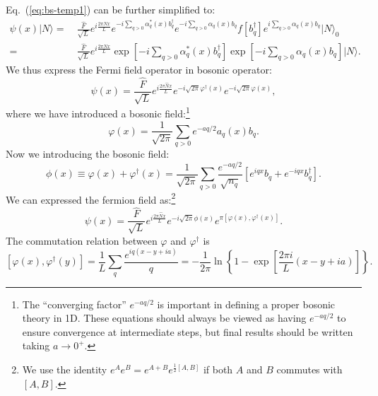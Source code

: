 Eq.~(\ref{eq:bs-temp1}) can be further simplified to:
\begin{equation*}
\begin{aligned}
	\psi(x)|N\rangle 
	=&\ \frac{\hat{F}}{\sqrt{L}} e^{i \frac{2 \pi \hat{N} x}{L}} e^{-i\sum_{q>0} \alpha^*_{q}(x) b_{q}^{\dagger}} e^{-i\sum_{q>0} \alpha_{q}(x) b_{q}} f\left[b_{q}^{\dagger}\right] e^{i\sum_{q>0} \alpha_{q}(x) b_{q}} |N\rangle_{0} \\
	=&\ \frac{\hat{F}}{\sqrt{L}} e^{i \frac{2 \pi \hat{N} x}{L}} \exp \left[-i\sum_{q>0} \alpha^*_{q}(x) b_{q}^{\dagger}\right] \exp \left[-i\sum_{q>0} \alpha_{q}(x) b_{q}\right]|N\rangle.
\end{aligned}
\end{equation*}
We thus express the Fermi field operator in bosonic operator:
\begin{equation}\label{eq:bs-fermi-field-1}
	\psi(x) = \frac{\hat{F}}{\sqrt{L}} e^{i \frac{2 \pi \hat{N} x}{L}} e^{-i\sqrt{2\pi}\varphi^\dagger(x)} e^{-i\sqrt{2\pi}\varphi(x)},
\end{equation}
where we have introduced a bosonic field:\footnote{The ``converging factor'' $e^{-a q / 2}$ is important in defining a proper bosonic theory in 1D. These equations should always be viewed as having $e^{-a q / 2}$ to ensure convergence at intermediate steps, but final results should be written taking $a \rightarrow 0^{+}$.}
\begin{equation}
	\varphi(x) = \frac{1}{\sqrt{2\pi}}\sum_{q>0} e^{-a q/2} a_{q}(x) b_{q}.
\end{equation}
Now we introducing the bosonic field:
\begin{equation}
	\phi(x) \equiv \varphi(x)+\varphi^{\dagger}(x)
	= \frac{1}{\sqrt{2\pi}} \sum_{q>0} \frac{e^{-a q/2}}{\sqrt{n_q}} \left[e^{i q x} b_{q}+e^{-i q x} b_{q}^{\dagger}\right].
\end{equation}
We can expressed the fermion field as:\footnote{We use the identity $e^A e^B = e^{A+B}e^{\frac{1}{2}[A,B]}$ if both $A$ and $B$ commutes with $[A,B]$.}
\begin{equation*}
	\psi(x) = \frac{\hat{F}}{\sqrt{L}} e^{i\frac{2\pi \hat N x}{L}} e^{-i\sqrt{2\pi}\phi(x)}
	e^{\pi[\varphi(x),\varphi^\dagger(x)]}.
\end{equation*}
The commutation relation between $\varphi$ and $\varphi^\dagger$ is
\begin{equation*}
	\left[\varphi(x),\varphi^\dagger(y)\right]
	= \frac{1}{L} \sum_q \frac{e^{iq(x-y+ia)}}{q} 
	= -\frac{1}{2\pi}\ln\left\{ 1-\exp\left[\frac{2\pi i}{L}(x-y+ia)\right]\right\}.
\end{equation*}
